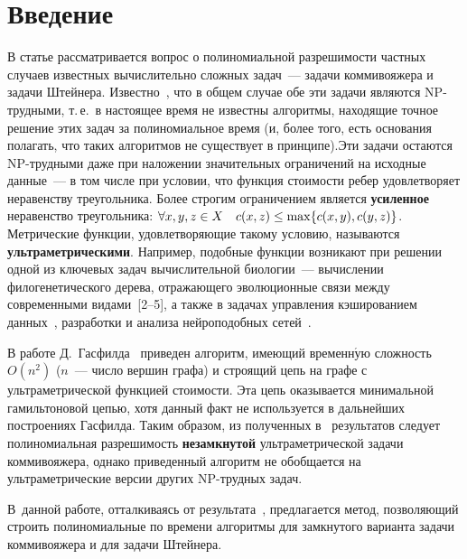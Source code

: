       \begin{multicols}{2}

            \label{st\stat}



\section{Введение}

В статье рассматривается вопрос о полиномиальной разрешимости
частных случаев известных вычислительно сложных задач~--- задачи
коммивояжера и задачи Штейнера. Известно~\cite{Gary_Johnson}, что в
общем случае обе эти задачи являются NP-труд\-ны\-ми, т.\,е.\ в
настоящее время не известны алгоритмы, находящие точное решение этих
задач за полиномиальное время (и, более того, есть основания
полагать, что таких алгоритмов не существует в принципе).\linebreak Эти задачи
остаются NP-трудными даже при наложении значительных ограничений на
исходные данные~--- в том числе при условии, что функция стои\-мости ребер
удовлетворяет неравенству треугольника. Более строгим ограничением
является \textbf{усиленное} неравенство треугольника: $ \forall x,y,z
\hm\in X \quad c(x,z) \hm\leq \max\{c(x,y), c(y,z)\} $. Метрические
функции, удовлетворяющие такому условию, называются \textbf{ульт\-ра\-мет\-ри\-че\-ски\-ми}. Например, подобные функции возникают при
решении одной из ключевых задач вычислительной биологии~---
вычислении филогенетического дерева, отража\-юще\-го эволюционные связи
между современными видами~[2--5],
а также в задачах управления кэшированием данных~\cite{Li},
разработки и анализа нейроподобных сетей~\cite{Kintsel}.

В работе Д.~Гасфилда~\cite{Gusfield} приведен алгоритм, имеющий временн$\acute{\mbox{у}}$ю сложность
$O(n^2)$ ($n$~--- чис\-ло вершин графа) и строящий цепь на графе с ульт\-ра\-мет\-рической функцией стои\-мости.
Эта цепь оказывается минимальной гамильтоновой цепью, хотя данный факт не используется в дальнейших построениях Гасфилда.
Таким образом, из полученных в~\cite{Gusfield} результатов следует
полиномиальная разрешимость \textbf{незамкнутой} ультраметрической задачи коммивояжера,
однако приведенный алгоритм не обобщается на ультраметрические версии других NP-трудных задач.

В~данной работе, отталкиваясь от результата~\cite{Gusfield}, предлагается метод,
позволяющий строить полиномиальные по времени алгоритмы для замкнутого варианта задачи коммивояжера и
для задачи Штейнера.


\end{multicols}
